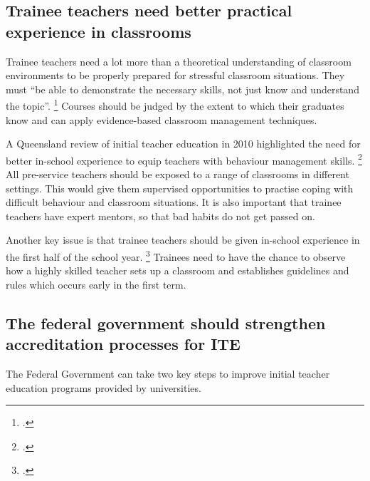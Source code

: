 \documentclass{grattan}
\begin{document}
\subsection{Trainee teachers need better practical experience in classrooms}\label{subsec:practical-experience-classrooms}
Trainee teachers need a lot more than a theoretical understanding of classroom environments to be properly prepared for stressful classroom situations. They must ``be able to demonstrate the necessary skills, not just know and understand the topic”.%
    \footcite[][11]{Caldwell2010ReviewTeacherEducation}
Courses should be judged by the extent to which their graduates know and can apply evidence-based classroom management techniques.

A Queensland review of initial teacher education in 2010 highlighted the need for better in-school experience to equip teachers with behaviour management skills.%
    \footcite{Caldwell2010ReviewTeacherEducation}
All pre-service teachers should be exposed to a range of classrooms in different settings. This would give them supervised opportunities to practise coping with difficult behaviour and classroom situations. It is also important that trainee teachers have expert mentors, so that bad habits do not get passed on.

Another key issue is that trainee teachers should be given in-school experience in the first half of the school year.%
    \footcites{Ingvarson2014BestPracticeTeacher}{Oliver2007EffectiveClassroomManagement} %
Trainees need to have the chance to observe how a highly skilled teacher sets up a classroom and establishes guidelines and rules which occurs early in the first term.

\subsection{The federal government should strengthen accreditation processes for ITE}\label{subsec:what-government-leaders}
The Federal Government can take two key steps to improve initial teacher education programs provided by universities.
\end{document}
